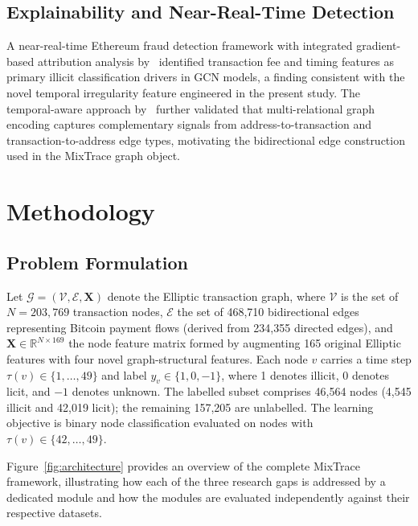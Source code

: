 \documentclass[12pt,a4paper]{article}
\begin{document}
\subsection{Explainability and Near-Real-Time Detection}

A near-real-time Ethereum fraud detection framework with
integrated gradient-based attribution analysis
by~\citet{ethereum2025xai} identified transaction fee and
timing features as primary illicit classification drivers in
GCN models, a finding consistent with the novel temporal
irregularity feature engineered in the present study.
The temporal-aware approach by~\citet{wei2025} further
validated that multi-relational graph encoding captures
complementary signals from address-to-transaction and
transaction-to-address edge types, motivating the
bidirectional edge construction used in the MixTrace graph
object.

\section{Methodology}
\label{sec:method}

\subsection{Problem Formulation}
\label{sec:problem}

Let $\mathcal{G} = (\mathcal{V}, \mathcal{E}, \mathbf{X})$
denote the Elliptic transaction graph, where $\mathcal{V}$
is the set of $N = 203{,}769$ transaction nodes,
$\mathcal{E}$ the set of 468,710 bidirectional edges
representing Bitcoin payment flows (derived from 234,355
directed edges), and $\mathbf{X} \in \mathbb{R}^{N \times 169}$
the node feature matrix formed by augmenting 165 original
Elliptic features with four novel graph-structural features.
Each node $v$ carries a time step $\tau(v) \in \{1,\ldots,49\}$
and label $y_v \in \{1, 0, -1\}$, where 1 denotes illicit,
0 denotes licit, and $-1$ denotes unknown.
The labelled subset comprises 46,564 nodes (4,545 illicit
and 42,019 licit); the remaining 157,205 are unlabelled.
The learning objective is binary node classification
evaluated on nodes with $\tau(v) \in \{42,\ldots,49\}$.

Figure~\ref{fig:architecture} provides an overview of the
complete MixTrace framework, illustrating how each of the
three research gaps is addressed by a dedicated module and
how the modules are evaluated independently against their
respective datasets.
\end{document}
